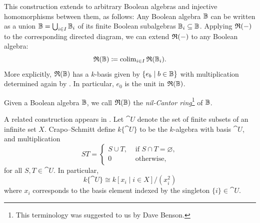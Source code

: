 \documentclass{amsart}
\begin{document}
    This construction extends to arbitrary Boolean algebras and injective homomorphisms between them, as follows: Any Boolean algebra $\mathbb{B}$ can be written as a union $\mathbb{B} = \bigcup_{i \in I}\mathbb{B}_i$ of its finite Boolean subalgebras $\mathbb{B}_i \subseteq \mathbb{B}$. Applying $\mathfrak{R}(-)$ to the corresponding directed diagram, we can extend $\mathfrak{R}(-)$ to any Boolean algebra: 
        \begin{equation}\label{eq:colimitring}
            \mathfrak{R}(\mathbb{B}) \coloneqq \operatorname{colim}_{i \in I} \mathfrak{R}(\mathbb{B}_i).
        \end{equation}
    More explicitly, $\mathfrak{R}(\mathbb{B})$ has a $k$-basis given by $\{e_{b}\mid b \in \mathbb{B}\}$ with multiplication determined again by . In particular, $e_0$ is the unit in $\mathfrak{R}(\mathbb{B})$.

    \begin{Def}\label{def:nilCantorring}
        Given a Boolean algebra $\mathbb{B}$, we call $\mathfrak{R}(\mathbb{B})$ the \emph{nil-Cantor ring}\footnote{This terminology was suggested to us by Dave Benson.} of $\mathbb{B}$.
    \end{Def}
    
    \begin{Rem}
        A related construction appears in \cite[p.~50]{CrapoSchmitt2008Primitive}. Let $\cat U$ denote the set of finite subsets of an infinite set $X$. Crapo--Schmitt define $k\{ \cat U \}$ to be the $k$-algebra with basis $\cat U$, and multiplication
        \[
        ST = \begin{cases}
            S \cup T, & \text{ if } S \cap T = \varnothing, \\
            0 & \text{ otherwise},
        \end{cases}
        \]
        for all $S,T \in \cat U$. In particular, 
        \[
        k\{ \cat U\} \cong k[x_i\mid i \in X]/(x_i^2)
        \]
        where $x_i$ corresponds to the basis element indexed by the singleton $\{i \} \in \cat U$. 
    \end{Rem}
    
\end{document}
